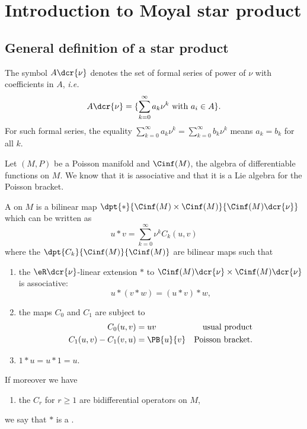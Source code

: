 \section{Introduction to Moyal star product}\label{app:Moyal}

\subsection{General definition of a star product}

The symbol $A\dcr{\nu}$ denotes the set of formal series of power of $\nu$ with coefficients in $A$, \textit{i.e.}
\[
A\dcr{\nu}=\{\sum_{k=0}^{\infty}a_k\nu^k\text{ with } a_i\in A\}.
\]
  For such formal series, the equality $\sum_{k=0}^{\infty}a_k\nu^k=\sum_{k=0}^{\infty}b_k\nu^k$ means $a_k=b_k$ for all $k$.

Let $(M,P)$ be a Poisson manifold and $\Cinf(M)$, the algebra of differentiable functions on $M$. We know that it is associative and that it is a Lie algebra for the Poisson bracket.


\begin{definition}
A  on $M$ is a bilinear map $\dpt{\ast}{\Cinf(M)\times\Cinf(M)}{\Cinf(M)\dcr{\nu}}$ which can be written as
\begin{equation}
       u\ast v=\sum_{k=0}^{\infty}\nu^kC_k(u,v)
\end{equation}
where the $\dpt{C_k}{\Cinf(M)}{\Cinf(M)}$ are bilinear maps such that
\renewcommand{\labelenumi}{(\roman{enumi})}
\begin{enumerate}
\item the $\eR\dcr{\nu}$-linear extension $\ast$ to $\Cinf(M)\dcr{\nu}\times\Cinf(M)\dcr{\nu}$ is associative:
\begin{equation}
                               u\ast(v\ast w)=(u\ast v)\ast w,
\end{equation}


\item the maps $C_0$ and $C_1$ are subject to
\begin{equation}
\begin{aligned}
  C_0(u,v)         &=uv       & \text{usual product}\\
  C_1(u,v)-C_1(v,u)&=\PB{u}{v}&\text{Poisson bracket}.
\end{aligned}
\end{equation}

\item $1\ast u=u\ast 1=u$.
\end{enumerate}
\setcounter{bidon}{\value{enumi}}
If moreover we have

\begin{enumerate}
\setcounter{enumi}{\value{bidon}}
\item the $C_r$ for $r\ge 1$ are bidifferential operators on $M$,
\end{enumerate}
we say that $\ast$ is a .

\end{definition}

